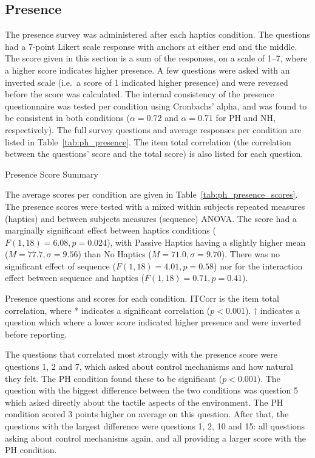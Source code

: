 \subsection{Presence}

The presence survey was administered after each haptics condition.
The questions had a 7-point Likert scale response with anchors at either end and the middle.
The score given in this section is a sum of the responses, on a scale of \numrange{1}{7}, where a higher score indicates higher presence.
A few questions were asked with an inverted scale (i.e.\ a score of 1 indicated higher presence) and were reversed before the score was calculated.
The internal consistency of the presence questionnaire was tested per condition using Cronbachs' alpha, and was found to be consistent in both conditions ($\alpha=0.72$ and $\alpha=0.71$ for PH and NH, respectively).
The full survey questions and average responses per condition are listed in Table~\ref{tab:ph_presence}.
The item total correlation (the correlation between the questions' score and the total score) is also listed for each question.

\begin{table}
    \centering
    \small
    \caption{Presence Score Summary}
    \label{tab:ph_presence_scores}
\end{table}

The average scores per condition are given in Table~\ref{tab:ph_presence_scores}.
The presence scores were tested with a mixed within subjects repeated measures (haptics) and between subjects measures (sequence) ANOVA.
The score had a marginally significant effect between haptics conditions ($F(1,18)=6.08, p=0.024$), with Passive Haptics having a slightly higher mean ($M=77.7, \sigma=9.56$) than No Haptics ($M=71.0, \sigma=9.70$).
There was no significant effect of sequence ($F(1,18)=4.01, p=0.58$) nor for the interaction effect between sequence and haptics ($F(1,18)=0.71, p=0.41$).

\begin{sidewaystable}
    \centering
    \caption{Presence questions and scores for each condition. ITCorr is the item total correlation, where * indicates a significant correlation ($p<0.001$). $\dagger$ indicates a question which where a lower score indicated higher presence and were inverted before reporting.}
    \label{tab:ph_presence}
\end{sidewaystable}

The questions that correlated most strongly with the presence score were questions 1, 2 and 7, which asked about control mechanisms and how natural they felt.
The PH condition found these to be significant ($p<0.001$).
The question with the biggest difference between the two conditions was question 5 which asked directly about the tactile aspects of the environment.
The PH condition scored 3 points higher on average on this question.
After that, the questions with the largest difference were questions 1, 2, 10 and 15: all questions asking about control mechanisms again, and all providing a larger score with the PH condition.

